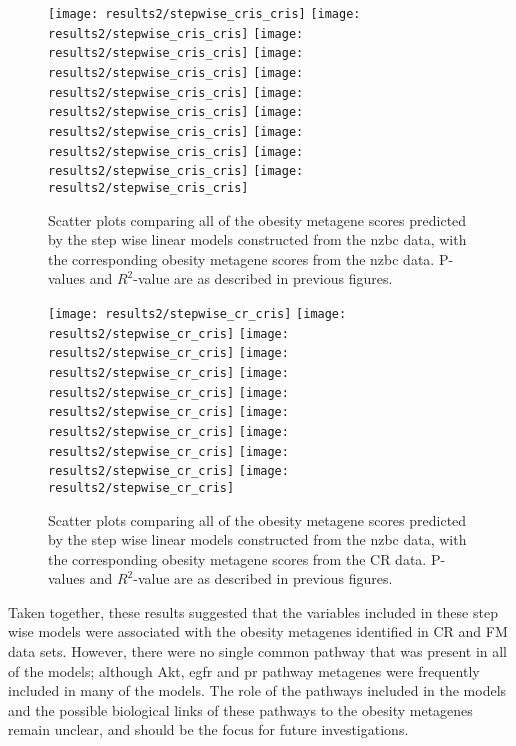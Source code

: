 \begin{figure}[htpb]
	\centering
	\texttt{[image: results2/stepwise\_cris\_cris]}
	\texttt{[image: results2/stepwise\_cris\_cris]}
	\texttt{[image: results2/stepwise\_cris\_cris]}
	\texttt{[image: results2/stepwise\_cris\_cris]}
	\texttt{[image: results2/stepwise\_cris\_cris]}
	\texttt{[image: results2/stepwise\_cris\_cris]}
	\texttt{[image: results2/stepwise\_cris\_cris]}
	\texttt{[image: results2/stepwise\_cris\_cris]}
	\texttt{[image: results2/stepwise\_cris\_cris]}
	\texttt{[image: results2/stepwise\_cris\_cris]}
	\caption[Comparison of all the obesity metagene scores predicted from the step wise linear models with the obesity metagene scores from the \gls{nzbc} data]{Scatter plots comparing all of the obesity metagene scores predicted by the step wise linear models constructed from the \gls{nzbc} data, with the corresponding obesity metagene scores from the \gls{nzbc} data.
	P-values and $R^2$-value are as described in previous figures.}
	\label{fig:stepwise_cris}
\end{figure}

\begin{figure}[htpb]
	\centering
	\texttt{[image: results2/stepwise\_cr\_cris]}
	\texttt{[image: results2/stepwise\_cr\_cris]}
	\texttt{[image: results2/stepwise\_cr\_cris]}
	\texttt{[image: results2/stepwise\_cr\_cris]}
	\texttt{[image: results2/stepwise\_cr\_cris]}
	\texttt{[image: results2/stepwise\_cr\_cris]}
	\texttt{[image: results2/stepwise\_cr\_cris]}
	\texttt{[image: results2/stepwise\_cr\_cris]}
	\texttt{[image: results2/stepwise\_cr\_cris]}
	\texttt{[image: results2/stepwise\_cr\_cris]}
	\caption[Comparison of all the obesity metagene scores predicted from the step wise linear models with the obesity metagene scores from the CR data]{Scatter plots comparing all of the obesity metagene scores predicted by the step wise linear models constructed from the \gls{nzbc} data, with the corresponding obesity metagene scores from the CR data.
	P-values and $R^2$-value are as described in previous figures.}
	\label{fig:stepwise_cr}
\end{figure}

Taken together, these results suggested that the variables included in these step wise models were associated with the obesity metagenes identified in CR and FM data sets.
However, there were no single common pathway that was present in all of the models; although Akt, \gls{egfr} and \gls{pr} pathway metagenes were frequently included in many of the models.
The role of the pathways included in the models and the possible biological links of these pathways to the obesity metagenes remain unclear, and should be the focus for future investigations.


